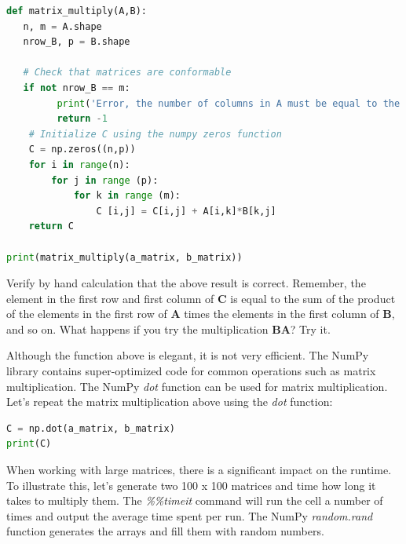 \documentclass[a4paper , 12pt]{book}
\begin{document}
\begin{center}
\begin{lstlisting}[language=Python, frame=single]
def matrix_multiply(A,B):
   n, m = A.shape
   nrow_B, p = B.shape
   
   # Check that matrices are conformable
   if not nrow_B == m:
         print('Error, the number of columns in A must be equal to the number of rows in B!')
         return -1
    # Initialize C using the numpy zeros function
    C = np.zeros((n,p))
    for i in range(n):
        for j in range (p):
            for k in range (m):
                C [i,j] = C[i,j] + A[i,k]*B[k,j]
    return C
    
print(matrix_multiply(a_matrix, b_matrix))
\end{lstlisting}   
\end{center}

Verify by hand calculation that the above result is correct. Remember, the element in the first row and first column of \textbf{C} is equal to the sum of the product of the elements in the first row of \textbf{A} times the elements in the first column of \textbf{B}, and so on. What happens if you try the multiplication \textbf{BA}? Try it.

Although the function above is elegant, it is not very efficient. The NumPy library contains super-optimized code for common operations such as matrix multiplication. The NumPy \textit{dot} function can be used for matrix multiplication. Let's repeat the matrix multiplication above using the \textit{dot} function:

\begin{center}
\begin{lstlisting}[language=Python, frame=single]
C = np.dot(a_matrix, b_matrix)
print(C)
\end{lstlisting}
\end{center}

When working with large matrices, there is a significant impact on the runtime. To illustrate this, let's generate two 100 x 100 matrices and time how long it takes to multiply them. The \textit{\%\%timeit} command will run the cell a number of times and output the average time spent per run. The NumPy \textit{random.rand} function generates the arrays and fill them with random numbers.
\end{document}
